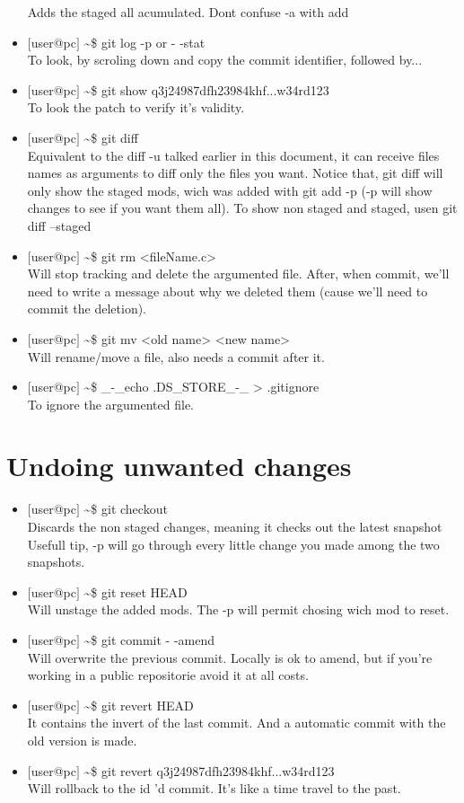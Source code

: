 \documentclass[12pt,a4paper]{article} %
\begin{document}
\begin{itemize}
Adds the staged all acumulated. Dont confuse -a with add
\item $[$user@pc$]$ \textasciitilde\$ git log -p or - -stat\\
To look, by scroling down and copy the commit identifier, followed by...
\item $[$user@pc$]$ \textasciitilde\$ git show q3j24987dfh23984khf...w34rd123\\
To look the patch to verify it's validity.
\item $[$user@pc$]$ \textasciitilde\$ git diff\\
Equivalent to the diff -u talked earlier in this document, it can receive files names as arguments to diff only the files you want. Notice that, git diff will only show the staged mods, wich was added with git add -p (-p will show changes to see if you want them all). To show non staged and staged, usen git diff --staged
\item $[$user@pc$]$ \textasciitilde\$ git rm <fileName.c>\\
Will stop tracking and delete the argumented file. After, when commit, we'll need to write a message about why we deleted them (cause we'll need to commit the deletion).
\item $[$user@pc$]$ \textasciitilde\$ git mv <old name> <new name>\\
Will rename/move a file, also needs a commit after it.
\item $[$user@pc$]$ \textasciitilde\$ \_-\_echo .DS\_STORE\_-\_ > .gitignore\\
To ignore the argumented file.
\end{itemize}

\section{Undoing unwanted changes}
\begin{itemize}
\item $[$user@pc$]$ \textasciitilde\$ git checkout\\
Discards the non staged changes, meaning it checks out the latest snapshot\\
Usefull tip, -p will go through every little change you made among the two snapshots.
\item $[$user@pc$]$ \textasciitilde\$ git reset HEAD\\
Will unstage the added mods. The -p will permit chosing wich mod to reset.
\item $[$user@pc$]$ \textasciitilde\$ git commit - -amend\\
Will overwrite the previous commit. Locally is ok to amend, but if you're working in a public repositorie avoid it at all costs.
\item $[$user@pc$]$ \textasciitilde\$ git revert HEAD\\
It contains the invert of the last commit. And a automatic commit with the old version is made.
\item $[$user@pc$]$ \textasciitilde\$ git revert q3j24987dfh23984khf...w34rd123\\
Will rollback to the id 'd commit. It's like a time travel to the past.
\end{itemize}
\end{document}
